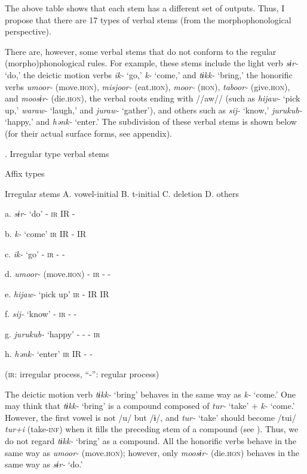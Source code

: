 The above table shows that each stem has a different set of outputs. Thus, I propose that there are 17 types of verbal stems (from the morphophonological perspective).

There are, however, some verbal stems that do not conform to the regular (morpho)phonological rules. For example, these stems include the light verb \textit{sɨr-} ‘do,’ the deictic motion verbs \textit{ik-} ‘go,’ \textit{k-} ‘come,’ and \textit{tɨkk-} ‘bring,’ the honorific verbs \textit{umoor-} (move.\textsc{hon}), \textit{misjoor-} (eat.\textsc{hon}), \textit{moor-} (\textsc{hon}), \textit{taboor-} (give.\textsc{hon}), and \textit{moosɨr-} (die.\textsc{hon}), the verbal roots ending with //aw// (such as \textit{hijaw-} ‘pick up,’ \textit{waraw-} ‘laugh,’ and \textit{juraw-} ‘gather’), and others such as \textit{sij-} ‘know,’ \textit{jurukub-} ‘happy,’ and \textit{hənk-} ‘enter.’ The subdivision of these verbal stems is shown below (for their actual surface forms, see appendix).

\begin{table}
\caption{\label{tab:key:59}. Irregular type verbal stems}

    Affix types

Irregular stems    A. vowel-initial  B. t-initial  C. deletion  D. others

a.  \textit{sɨr-} ‘do’    {}-  \textsc{ir}  IR  {}-

b.  \textit{k-} ‘come’    \textsc{ir}  IR  {}-  IR

c.  \textit{ik-} ‘go’    {}-  \textsc{ir}  {}-  {}-

d.  \textit{umoor-} (move.\textsc{hon})    {}-  \textsc{ir}  {}-  {}-

e.  \textit{hijaw-} ‘pick up’    \textsc{ir}  {}-  IR  IR

f.  \textit{sij-} ‘know’    {}-  \textsc{ir}  {}-  {}-

g.  \textit{jurukub-} ‘happy’    {}-  {}-  {}-  \textsc{ir}

h.  \textit{hənk-} ‘enter’    \textsc{ir}  IR  {}-  {}-

(\textsc{ir}: irregular process, “-”: regular process)
\end{table}

The deictic motion verb \textit{tɨkk-} ‘bring’ behaves in the same way as \textit{k-} ‘come.’ One may think that \textit{tɨkk-} ‘bring’ is a compound composed of \textit{tur-} ‘take’ + \textit{k-} ‘come.’ However, the first vowel is not /u/ but /ɨ/, and \textit{tur-} ‘take’ should become /tui/ \textit{tur+i} (take-\textsc{inf}) when it fills the preceding stem of a compound (see ). Thus, we do not regard \textit{tɨkk-} ‘bring’ as a compound. All the honorific verbs behave in the same way as \textit{umoor-} (move.\textsc{hon}); however, only \textit{moosɨr-} (die.\textsc{hon}) behaves in the same way as \textit{sɨr-} ‘do.’

